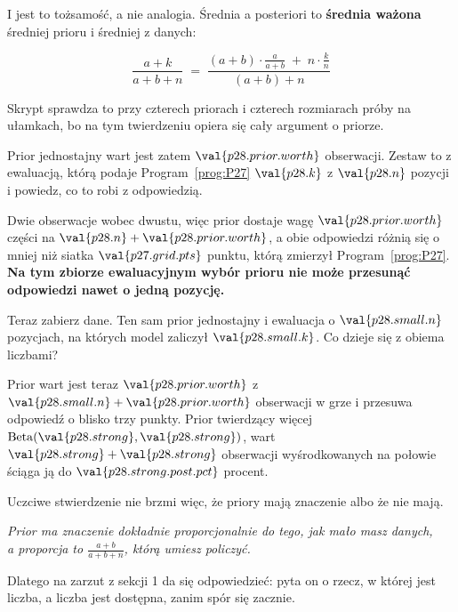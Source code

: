 \begin{fr}

I jest to tożsamość, a nie analogia. Średnia a posteriori to \textbf{średnia
ważona} średniej prioru i średniej z danych:

\[ \frac{a+k}{a+b+n}
   \;=\;
   \frac{(a+b)\cdot\frac{a}{a+b} \;+\; n\cdot\frac{k}{n}}{(a+b) + n} \]

Skrypt sprawdza to przy czterech priorach i czterech rozmiarach próby na
ułamkach, bo na tym twierdzeniu opiera się cały argument o priorze.

Prior jednostajny wart jest zatem $\val{p28.prior.worth}$ obserwacji. Zestaw
to z ewaluacją, którą podaje Program~\ref{prog:P27} \dash{}
$\val{p28.k}$ z $\val{p28.n}$ pozycji \dash{} i powiedz, co to robi z
odpowiedzią.
\dotline
\nextframe
\end{fr}

\begin{fr}

Dwie obserwacje wobec dwustu, więc prior dostaje wagę
$\val{p28.prior.worth}$ części na $\val{p28.n} + \val{p28.prior.worth}$, a obie
odpowiedzi różnią się o mniej niż siatka $\val{p27.grid.pts}$ punktu, którą
zmierzył Program~\ref{prog:P27}. \textbf{Na tym zbiorze ewaluacyjnym wybór
prioru nie może przesunąć odpowiedzi nawet o jedną pozycję.}


Teraz zabierz dane. Ten sam prior jednostajny i ewaluacja o
$\val{p28.small.n}$ pozycjach, na których model zaliczył
$\val{p28.small.k}$. Co dzieje się z obiema liczbami?
\dotline
\nextframe
\end{fr}

\begin{fr}

Prior wart jest teraz $\val{p28.prior.worth}$ z
$\val{p28.small.n} + \val{p28.prior.worth}$ obserwacji w grze i przesuwa
odpowiedź o blisko trzy punkty. Prior twierdzący więcej \dash{}
$\mathrm{Beta}(\val{p28.strong}, \val{p28.strong})$, wart
$\val{p28.strong}+\val{p28.strong}$ obserwacji wyśrodkowanych na połowie
\dash{} ściąga ją do $\val{p28.strong.post.pct}$ procent.

Uczciwe stwierdzenie nie brzmi więc, że priory mają znaczenie albo że nie mają.

\begin{center}
\emph{Prior ma znaczenie dokładnie proporcjonalnie do tego, jak mało masz
danych,\\
a proporcja to $\frac{a+b}{a+b+n}$, którą umiesz policzyć.}
\end{center}

Dlatego na zarzut z sekcji 1 da się odpowiedzieć: pyta on o rzecz, w której
jest liczba, a liczba jest dostępna, zanim spór się zacznie.
\end{fr}

